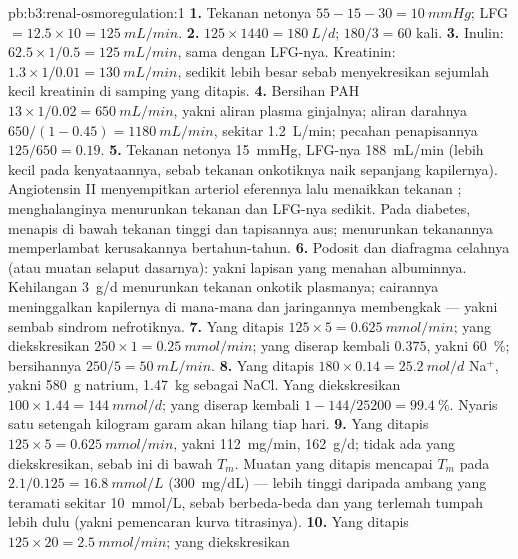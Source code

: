 \begin{solution}{pb:b3:renal-osmoregulation:1}
\textbf{1.} Tekanan netonya $55 - 15 - 30 = \qty{10}{mmHg}$; LFG $= 12.5
\times 10 = \qty{125}{mL/min}$.
\textbf{2.} $125\times 1440 = \qty{180}{L/d}$; $180/3 = 60$ kali.
\textbf{3.} Inulin: $62.5\times 1/0.5 = \qty{125}{mL/min}$, sama dengan
LFG-nya. Kreatinin: $1.3\times 1/0.01 = \qty{130}{mL/min}$, sedikit
lebih besar sebab  menyekresikan sejumlah kecil
kreatinin di samping yang ditapis.
\textbf{4.} Bersihan PAH $13\times 1/0.02 = \qty{650}{mL/min}$, yakni
aliran plasma ginjalnya; aliran darahnya $650/(1 - 0.45) = \qty{1180}{mL/min}$,
sekitar \qty{1.2}{L/min}; pecahan penapisannya $125/650 = 0.19$.
\textbf{5.} Tekanan netonya \qty{15}{mmHg}, LFG-nya \qty{188}{mL/min} (lebih kecil pada
kenyataannya, sebab tekanan onkotiknya naik sepanjang kapilernya).
Angiotensin II menyempitkan arteriol eferennya lalu menaikkan
tekanan ; menghalanginya menurunkan tekanan dan LFG-nya
sedikit. Pada diabetes,  menapis di bawah tekanan tinggi dan
tapisannya aus; menurunkan tekanannya memperlambat kerusakannya bertahun-tahun.
\textbf{6.} Podosit dan diafragma celahnya (atau muatan
selaput dasarnya): yakni lapisan yang menahan albuminnya. Kehilangan
\qty{3}{g/d} menurunkan tekanan onkotik plasmanya; cairannya meninggalkan
kapilernya di mana-mana dan jaringannya membengkak --- yakni sembab
sindrom nefrotiknya.
\textbf{7.} Yang ditapis $125\times 5 = \qty{0.625}{mmol/min}$; yang diekskresikan
$250\times 1 = \qty{0.25}{mmol/min}$; yang diserap kembali $0.375$, yakni
\qty{60}{\%}; bersihannya $250/5 = \qty{50}{mL/min}$.
\textbf{8.} Yang ditapis $180\times 0.14 = \qty{25.2}{mol/d}$ Na$^{+}$,
yakni \qty{580}{g} natrium, \qty{1.47}{kg} sebagai NaCl. Yang diekskresikan $100\times 1.44
= \qty{144}{mmol/d}$; yang diserap kembali $1 - 144/\num{25200} = \qty{99.4}{\%}$.
Nyaris satu setengah kilogram garam akan hilang tiap hari.
\textbf{9.} Yang ditapis $125\times 5 = \qty{0.625}{mmol/min}$, yakni
\qty{112}{mg/min}, \qty{162}{g/d}; tidak ada yang diekskresikan, sebab ini di bawah
$T_{m}$. Muatan yang ditapis mencapai $T_{m}$ pada $2.1/0.125 =
\qty{16.8}{mmol/L}$ (\qty{300}{mg/dL}) --- lebih tinggi daripada ambang
yang teramati sekitar \qty{10}{mmol/L}, sebab  berbeda-beda dan
yang terlemah tumpah lebih dulu (yakni pemencaran kurva titrasinya).
\textbf{10.} Yang ditapis $125\times 20 = \qty{2.5}{mmol/min}$; yang diekskresikan

\end{solution}
